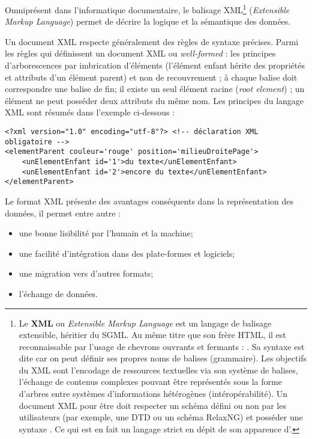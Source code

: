 Omniprésent dans l'informatique documentaire, le balisage XML\footnote{Le \textbf{XML} ou \textit{Extensible Markup Language} est un langage de balisage extensible, héritier du SGML. Au même titre que son frère HTML, il est reconnaissable par l'usage de chevrons ouvrants et fermants : \citecode{< >}. Sa syntaxe est dite  car on peut définir ses propres noms de balises (grammaire). Les objectifs du XML sont l'encodage de ressources textuelles via son système de balises, l'échange de contenus complexes pouvant être représentés sous la forme d'arbres entre systèmes d'informations hétérogènes (intéropérabilité). Un document XML pour être  doit respecter un schéma défini ou non par les utilisateurs (par exemple, une DTD ou un schéma RelaxNG) et posséder une syntaxe . Ce qui est en fait un langage strict en dépit de son apparence d'.} (\textit{Extensible Markup Language}) permet de décrire la logique et la sémantique des données. 

Un document XML respecte généralement des règles de syntaxe précises. Parmi les règles qui définissent un document XML  ou \textit{well-formed} : les principes d'arborescences par imbrication d'éléments (l'élément enfant hérite des propriétés et attributs d'un élément parent) et non de recouvrement ; à chaque balise doit correspondre une balise de fin; il existe un seul élément racine (\textit{root element}) ; un élément ne peut posséder deux attributs du même nom. Les principes du langage XML sont résumés dans l'exemple ci-dessous : \\

\lstset{language=XML}
\begin{lstlisting}
<?xml version="1.0" encoding="utf-8"?> <!-- déclaration XML obligatoire -->
<elementParent couleur='rouge' position='milieuDroitePage'>
    <unElementEnfant id='1'>du texte</unElementEnfant>
    <unElementEnfant id='2'>encore du texte</unElementEnfant>
</elementParent>
\end{lstlisting} 
\newpage
Le format XML présente des avantages conséquents dans la représentation des données, il permet entre autre :
\begin{itemize}
    \item une bonne lisibilité par l'humain et la machine;
    \item une facilité d'intégration dans des plate-formes et logiciels;
    \item une migration vers d'autres formats;
    \item l'échange de données.
\end{itemize}


